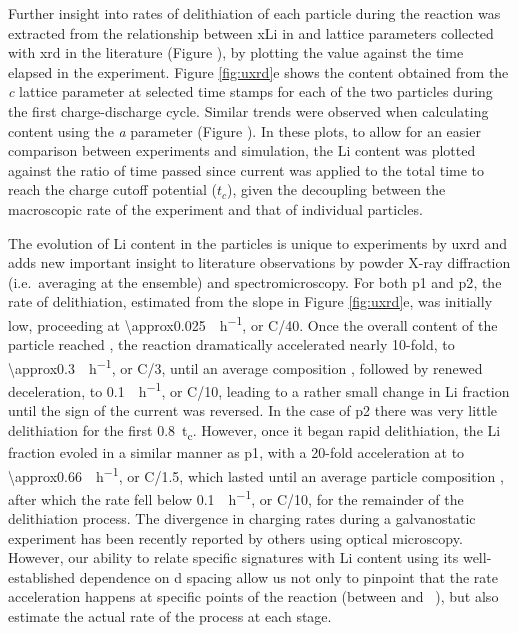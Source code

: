 \documentclass{article}
\begin{document}
\newpage %
Further insight into rates of delithiation of each particle during the
reaction was extracted from the relationship between \gls{xLi} in
 and lattice parameters collected with \gls{xrd} in the
literature\cite{robert2015} (Figure ), by
plotting the value against the time elapsed in the experiment. Figure
\ref{fig:uxrd}e shows the  content obtained from the \emph{c}
lattice parameter at selected time stamps for each of the two 
particles during the first charge-discharge cycle. Similar trends were
observed when calculating  content using the \emph{a} parameter
(Figure ). In these plots, to allow for an easier
comparison between experiments and simulation, the Li content was
plotted against the ratio of time passed since current was applied to
the total time to reach the charge cutoff potential ($t_c$), given the
decoupling between the macroscopic rate of the experiment and that of
individual particles.

The evolution of Li content in the particles is unique to experiments by \gls{uxrd} and adds new important insight to literature observations by powder X-ray diffraction (i.e.\ averaging at the ensemble) and spectromicroscopy\cite{doeff2017,wolf2017,hulzen2018,ahn2017,zhou2016-2,robert2015,yoon2006,hua2018,grenier2017,chapman2020,chueh2021, zhao2022, rao2021, wang2020-6}. For both \gls{p1} and \gls{p2}, the rate of delithiation, estimated
from the slope in Figure \ref{fig:uxrd}e, was initially low,
proceeding at \SI{\approx0.025}{\per\hour}, or C/40. Once the
overall content of the particle reached , the reaction
dramatically accelerated nearly 10-fold, to
\SI{\approx0.3}{\per\hour}, or C/3, until an average
composition , followed by renewed deceleration, to
\SI{0.1}{\per\hour}, or C/10, leading to a rather small change
in Li fraction until the sign of the current was reversed. In the case
of \gls{p2} there was very little delithiation for the first
\SI{0.8}{t_c}. However, once it began rapid delithiation, the Li
fraction evoled in a similar manner as \gls{p1}, with a 20-fold
acceleration at  to \SI{\approx0.66}{\per\hour}, or
C/1.5, which lasted until an average particle composition ,
after which the rate fell below \SI{0.1}{\per\hour}, or C/10,
for the remainder of the delithiation process. The divergence in
charging rates during a galvanostatic experiment has been recently
reported by others using optical microscopy\cite{zhao2022}. However, our ability to
relate specific signatures with Li content using its well-established
dependence on d spacing allow us not only to pinpoint that the rate
acceleration happens at specific points of the reaction (between
 and ~), but also estimate the actual rate of the
process at each stage.
\end{document}

